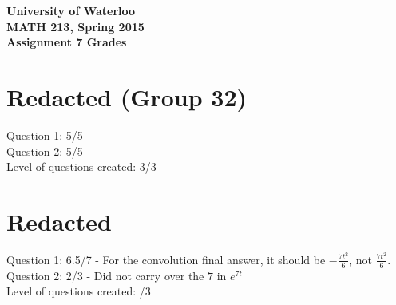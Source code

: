 \documentclass[12pt]{article}
\begin{document}
\begin{center}
{\Large\bf University of Waterloo}\\
\vspace{3mm}
{\Large\bf MATH 213, Spring 2015}\\
\vspace{2mm}
{\Large\bf Assignment 7 Grades}\\
\end{center}

\section*{Redacted (Group 32)}

Question 1: 5/5 \\
Question 2: 5/5 \\

\noindent Level of questions created: 3/3

\section*{Redacted}

Question 1: 6.5/7 - For the convolution final answer, it should be $-\frac{7t^2}{6}$, not $\frac{7t^2}{6}$. \\
Question 2: 2/3 - Did not carry over the $7$ in $e^{7t}$\\

\noindent Level of questions created: /3
\end{document}

